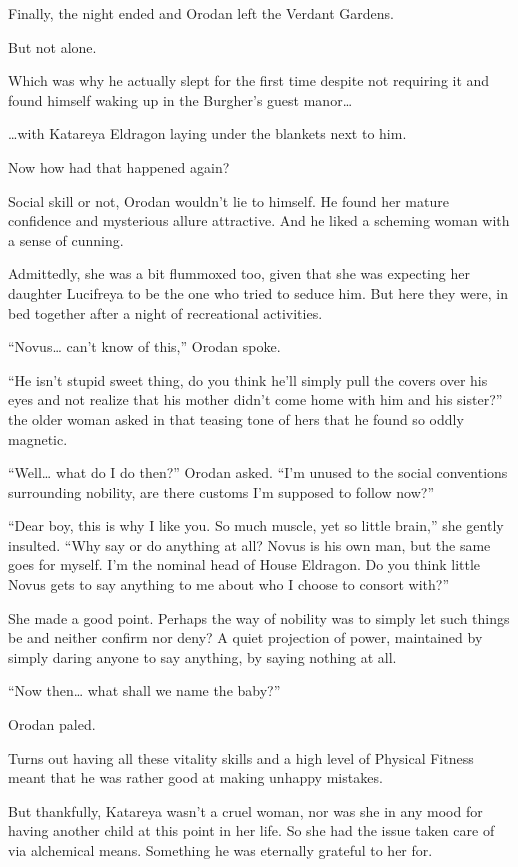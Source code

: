\documentclass[a4paper,10pt]{book}
\begin{document}
Finally, the night ended and Orodan left the Verdant Gardens.\par
But not alone.\par
Which was why he actually slept for the first time despite not requiring it and found himself waking up in the Burgher’s guest manor…\par
…with Katareya Eldragon laying under the blankets next to him.\par
Now how had that happened again?\par
Social skill or not, Orodan wouldn’t lie to himself. He found her mature confidence and mysterious allure attractive. And he liked a scheming woman with a sense of cunning.\par
Admittedly, she was a bit flummoxed too, given that she was expecting her daughter Lucifreya to be the one who tried to seduce him. But here they were, in bed together after a night of recreational activities.\par
“Novus… can’t know of this,” Orodan spoke.\par
“He isn’t stupid sweet thing, do you think he’ll simply pull the covers over his eyes and not realize that his mother didn’t come home with him and his sister?” the older woman asked in that teasing tone of hers that he found so oddly magnetic.\par
“Well… what do I do then?” Orodan asked. “I’m unused to the social conventions surrounding nobility, are there customs I’m supposed to follow now?”\par
“Dear boy, this is why I like you. So much muscle, yet so little brain,” she gently insulted. “Why say or do anything at all? Novus is his own man, but the same goes for myself. I’m the nominal head of House Eldragon. Do you think little Novus gets to say anything to me about who I choose to consort with?”\par
She made a good point. Perhaps the way of nobility was to simply let such things be and neither confirm nor deny? A quiet projection of power, maintained by simply daring anyone to say anything, by saying nothing at all.\par
“Now then… what shall we name the baby?”\par
Orodan paled.\par
\par
Turns out having all these vitality skills and a high level of Physical Fitness meant that he was rather good at making unhappy mistakes.\par
But thankfully, Katareya wasn’t a cruel woman, nor was she in any mood for having another child at this point in her life. So she had the issue taken care of via alchemical means. Something he was eternally grateful to her for.\par
\end{document}
